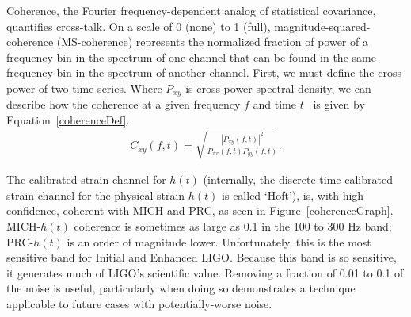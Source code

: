 	 Coherence, the Fourier frequency-dependent analog of statistical covariance, quantifies cross-talk. On a scale of 0 (none) to 1 (full), magnitude-squared-coherence (MS-coherence) represents the normalized fraction of power of a frequency bin in the spectrum of one channel that can be found in the same frequency bin in the spectrum of another channel. First, we must define the cross-power of two time-series. Where $P_{xy}$ is cross-power spectral density, 
%
% 
%
we can describe how the coherence at a given frequency $f$ and time $t$~\cite{Boashash1990} is given by Equation~\ref{coherenceDef}. 
\begin{eqnarray}
C_{xy}(f, t) = \sqrt{\frac{\left| P_{xy}(f, t) \right|^2}{P_{xx}(f, t) P_{yy} (f, t)}}\label{coherenceDef}.
\end{eqnarray}



The calibrated strain channel for $h(t)$ (internally, the discrete-time calibrated strain channel for the physical strain $h(t)$ is called `Hoft'), is, with high confidence, coherent with MICH and PRC, as seen in Figure~\ref{coherenceGraph}. MICH-$h(t)$ coherence is sometimes as large as 0.1 in the 100 to 300 Hz band; PRC-$h(t)$ is an order of magnitude lower. Unfortunately, this is the most sensitive band for Initial and Enhanced LIGO. 
Because this band is so sensitive, it generates much of LIGO's scientific value.
Removing a fraction of 0.01 to 0.1 of the noise is useful, particularly when doing so demonstrates a technique applicable to future cases with potentially-worse noise.


